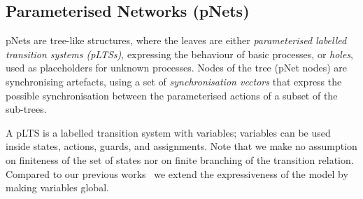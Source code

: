 \documentclass{lmcs}
\newcommand{\LUDO}[1]{\textcolor{darkgreen}{#1}}
\begin{document}
\subsection{Parameterised Networks (pNets)}
\label{section:pnets}

pNets are tree-like structures, where the leaves are either \emph{parameterised labelled transition systems (pLTSs)}, expressing the
behaviour of basic processes, or \emph{holes}, used as placeholders
for unknown processes. 
Nodes of the tree (pNet nodes) are synchronising artefacts, using a
set of \emph{synchronisation vectors} that express the possible
synchronisation between the parameterised actions of a subset of the sub-trees.



A pLTS is a labelled transition system with variables; variables can be
used inside states, actions, guards, and
assignments. 
Note that we make no assumption on finiteness of the set of states nor
on finite branching of the transition relation. Compared to our previous works~\cite{henrio:Forte2016,AmeurBoulifa2017} we extend the expressiveness of the model by making variables global.
\end{document}
